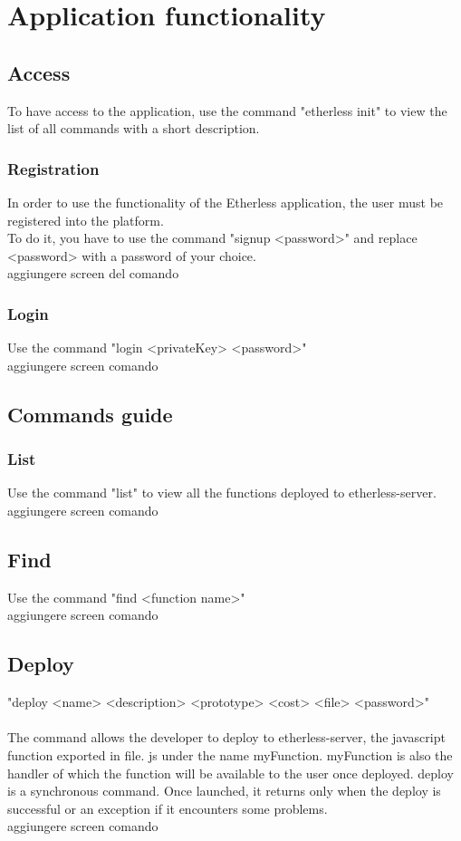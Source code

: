 \section{Application functionality}
\subsection{Access}
To have access to the application, use the command "etherless init" to view the list of all commands with a short description.

\subsubsection{Registration}
In order to use the functionality of the Etherless application, the user must be registered into the platform.\\
To do it, you have to use the command "signup <password>" and replace <password>  with a password of your choice.
\\
aggiungere screen del comando 

\subsubsection{Login}
Use the command "login <privateKey> <password>"
\\aggiungere screen comando


\subsection{Commands guide}
\subsubsection{List}
Use the command "list" to view all the functions deployed to etherless-server. 
\\aggiungere screen comando


\subsection{Find}
Use the command "find <function name>"
\\aggiungere screen comando

\subsection{Deploy}
 "deploy <name> <description> <prototype> <cost> <file> <password>"\\
\\
The command allows the developer to deploy to etherless-server, the javascript function exported in file. js under the name myFunction. myFunction is also the handler of which the function will be available to the user once deployed. deploy is a synchronous command. Once launched, it returns only when the deploy is successful or an exception if it encounters some problems. 
\\
aggiungere screen comando

